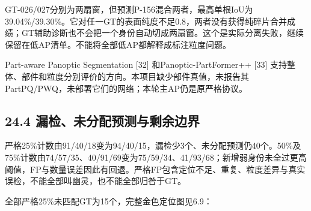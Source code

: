 \documentclass[UTF8,fontset=fandol]{ctexart}
\begin{document}
GT-026/027分别为两扇窗，但预测P-156混合两者，最高单根IoU为39.04\%/39.30\%。它对任一GT的表面纯度不足0.8，两者没有获得纯碎片合并成绩；GT辅助诊断也不会把一个身份自动切成两扇窗。这个是实际分离失败，继续保留在低AP清单。不能将全部低AP都解释成标注粒度问题。



Part-aware Panoptic Segmentation [32] 和Panoptic-PartFormer++ [33] 支持整体、部件和粒度分别评价的方向。本项目缺少部件真值，未报告其PartPQ/PWQ，未部署它们的网络；本轮主AP仍是原严格协议。



\subsection*{24.4 漏检、未分配预测与剩余边界}

严格25\%计数由91/40/18变为94/40/15，漏检少3个、未分配预测仍40个。50\%及75\%计数由74/57/35、40/91/69变为75/59/34、41/93/68；新增弱身份未全过更高阈值，FP与数量误差因此有回退。严格FP包含定位不足、重复、粒度差异与真实误检，不能全部叫幽灵，也不能全部归咎于GT。



全部严格25\%未匹配GT为15个，完整金色定位图见6.9：
\end{document}

